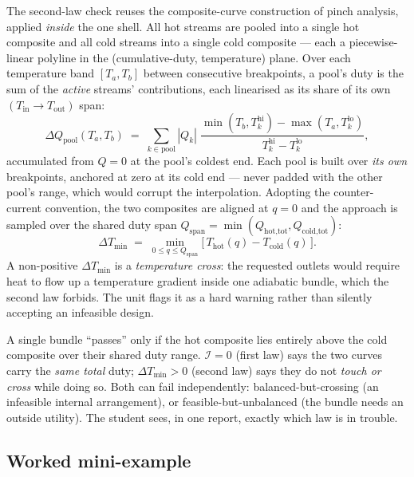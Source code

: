 \documentclass[11pt,a4paper]{article}
\begin{document}
The second-law check reuses the composite-curve construction of pinch
analysis, applied \emph{inside} the one shell.  All hot streams are
pooled into a single hot composite and all cold streams into a single
cold composite --- each a piecewise-linear polyline in the
(cumulative-duty, temperature) plane.  Over each temperature band
$[T_a, T_b]$ between consecutive breakpoints, a pool's duty is the sum of
the \emph{active} streams' contributions, each linearised as its share
of its own $(T_{\text{in}}\!\to\!T_{\text{out}})$ span:
\begin{equation}
   \Delta Q_{\text{pool}}(T_a, T_b)
   \;=\; \sum_{k\in\text{pool}}
         |Q_k|\;\frac{\min(T_b, T_k^{\text{hi}}) - \max(T_a, T_k^{\text{lo}})}
                     {T_k^{\text{hi}} - T_k^{\text{lo}}},
\end{equation}
accumulated from $Q=0$ at the pool's coldest end.  Each pool is built
over \emph{its own} breakpoints, anchored at zero at its cold end ---
never padded with the other pool's range, which would corrupt the
interpolation.  Adopting the counter-current convention, the two
composites are aligned at $q = 0$ and the approach is sampled over the
shared duty span $Q_{\text{span}} = \min(Q_{\text{hot,tot}},
Q_{\text{cold,tot}})$:
\begin{equation}
   \Delta T_{\min}
   \;=\; \min_{0 \le q \le Q_{\text{span}}}
         \bigl[\,T_{\text{hot}}(q) - T_{\text{cold}}(q)\,\bigr].
   \label{eq:mheatx-dtmin}
\end{equation}
A non-positive $\Delta T_{\min}$ is a \emph{temperature cross}: the
requested outlets would require heat to flow up a temperature gradient
inside one adiabatic bundle, which the second law forbids.  The unit
flags it as a hard warning rather than silently accepting an infeasible
design.

\begin{intuition}
A single bundle ``passes'' only if the hot composite lies entirely
above the cold composite over their shared duty range.  $\mathcal I = 0$
(first law) says the two curves carry the \emph{same total} duty;
$\Delta T_{\min} > 0$ (second law) says they do not \emph{touch or
cross} while doing so.  Both can fail independently: balanced-but-crossing
(an infeasible internal arrangement), or feasible-but-unbalanced (the
bundle needs an outside utility).  The student sees, in one report,
exactly which law is in trouble.
\end{intuition}

\subsection{Worked mini-example}
\end{document}
